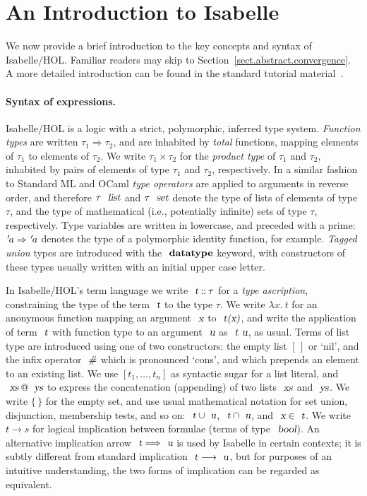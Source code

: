 \section{An Introduction to Isabelle}
\label{subsect.an.overview.of.isabelle}

We now provide a brief introduction to the key concepts and syntax of Isabelle/HOL.
Familiar readers may skip to Section~\ref{sect.abstract.convergence}.
A more detailed introduction can be found in the standard tutorial material~\cite{DBLP:books/sp/NipkowK14}.

\paragraph{Syntax of expressions.}

Isabelle/HOL is a logic with a strict, polymorphic, inferred type system.
\emph{Function types} are written $\tau_1 \Rightarrow \tau_2$, and are inhabited by \emph{total} functions, mapping elements of $\tau_1$ to elements of $\tau_2$.
We write $\tau_1 \times \tau_2$ for the \emph{product type} of $\tau_1$ and $\tau_2$, inhabited by pairs of elements of type $\tau_1$ and $\tau_2$, respectively.
In a similar fashion to Standard ML and OCaml \emph{type operators} are applied to arguments in reverse order, and therefore $\tau\ \isa{list}$ and $\tau\ \isa{set}$ denote the type of lists of elements of type $\tau$, and the type of mathematical (i.e., potentially infinite) sets of type $\tau$, respectively.
Type variables are written in lowercase, and preceded with a prime: ${\emph{$\mskip2mu{'}\mskip-2mu$}}a \Rightarrow {\emph{$\mskip2mu{'}\mskip-2mu$}}a$ denotes the type of a polymorphic identity function, for example.
\emph{Tagged union} types are introduced with the $\isacommand{datatype}$ keyword, with constructors of these types usually written with an initial upper case letter.

In Isabelle/HOL's term language we write $\isa{t} \mathbin{::} \tau$ for a \emph{type ascription}, constraining the type of the term $\isa{t}$ to the type $\tau$.
We write $\lambda{x}.\: t$ for an anonymous function mapping an argument $\isa{x}$ to $\isa{t(x)}$, and write the application of term $\isa{t}$ with function type to an argument $\isa{u}$ as $\isa{t\ u}$, as usual.
Terms of list type are introduced using one of two constructors: the empty list $[\,]$ or `nil', and the infix operator $\isa{\#}$ which is pronounced `cons', and which prepends an element to an existing list.
We use $[t_1, \ldots, t_n]$ as syntactic sugar for a list literal, and $\isa{xs} \mathbin{\isacharat} \isa{ys}$ to express the concatenation (appending) of two lists $\isa{xs}$ and $\isa{ys}$.
We write $\{\,\}$ for the empty set, and use usual mathematical notation for set union, disjunction, membership tests, and so on: $\isa{t} \cup \isa{u}$, $\isa{t} \cap \isa{u}$, and $\isa{x} \in \isa{t}$.
We write $t \longrightarrow s$ for logical implication between formulae (terms of type $\isa{bool}$).
An alternative implication arrow $\isa{t} \Longrightarrow \isa{u}$ is used by Isabelle in certain contexts; it is subtly different from standard implication $\isa{t} \longrightarrow \isa{u}$, but for purposes of an intuitive understanding, the two forms of implication can be regarded as equivalent.


